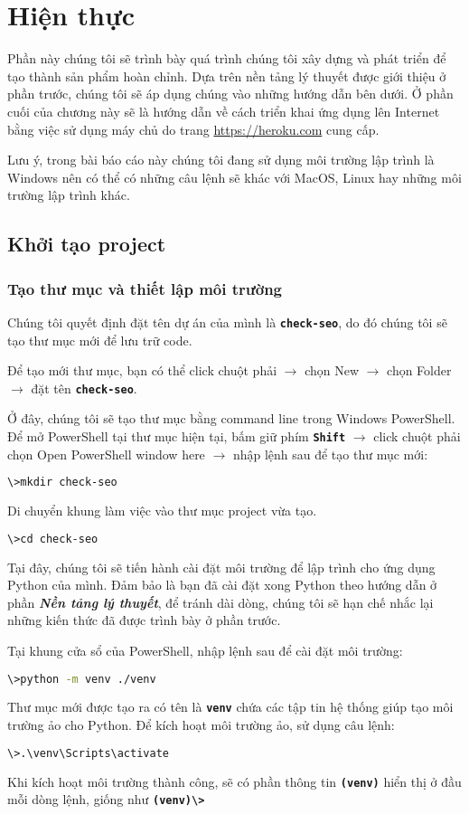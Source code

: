 \chapter{Hiện thực}
Phần này chúng tôi sẽ trình bày quá trình chúng tôi xây dựng và phát triển để tạo thành sản phẩm hoàn chỉnh. Dựa trên nền tảng lý thuyết được giới thiệu ở phần trước, chúng tôi sẽ áp dụng chúng vào những hướng dẫn bên dưới. Ở phần cuối của chương này sẽ là hướng dẫn về cách triển khai ứng dụng lên Internet bằng việc sử dụng máy chủ do trang \url{https://heroku.com} cung cấp.
\par
Lưu ý, trong bài báo cáo này chúng tôi đang sử dụng môi trường lập trình là Windows nên có thể có những câu lệnh sẽ khác với MacOS, Linux hay những môi trường lập trình khác.
\section{Khởi tạo project}
\subsection{Tạo thư mục và thiết lập môi trường}
Chúng tôi quyết định đặt tên dự án của mình là \textbf{\texttt{check-seo}}, do đó chúng tôi sẽ tạo thư mục mới để lưu trữ code.
\par
Để tạo mới thư mục, bạn có thể click chuột phải $\rightarrow$ chọn New $\rightarrow$ chọn Folder $\rightarrow$ đặt tên \textbf{\texttt{check-seo}}.
\par
Ở đây, chúng tôi sẽ tạo thư mục bằng command line trong Windows PowerShell. Để mở PowerShell tại thư mục hiện tại, bấm giữ phím \textbf{\texttt{Shift}} $\rightarrow$ click chuột phải chọn Open PowerShell window here $\rightarrow$ nhập lệnh sau để tạo thư mục mới:
\begin{lstlisting}[language=bash]
\>mkdir check-seo
\end{lstlisting}
\par
Di chuyển khung làm việc vào thư mục project vừa tạo.
\begin{lstlisting}[language=bash]
\>cd check-seo
\end{lstlisting}
\par
Tại đây, chúng tôi sẽ tiến hành cài đặt môi trường để lập trình cho ứng dụng Python của mình. Đảm bảo là bạn đã cài đặt xong Python theo hướng dẫn ở phần \textbf{\textit{Nền tảng lý thuyết}}, để tránh dài dòng, chúng tôi sẽ hạn chế nhắc lại những kiến thức đã được trình bày ở phần trước.
\par
Tại khung cửa sổ của PowerShell, nhập lệnh sau để cài đặt môi trường:
\begin{lstlisting}[language=bash]
\>python -m venv ./venv
\end{lstlisting}
\par
Thư mục mới được tạo ra có tên là \textbf{\texttt{venv}} chứa các tập tin hệ thống giúp tạo môi trường ảo cho Python. Để kích hoạt môi trường ảo, sử dụng câu lệnh:
\begin{lstlisting}[language=bash]
\>.\venv\Scripts\activate
\end{lstlisting}
\par
Khi kích hoạt môi trường thành công, sẽ có phần thông tin \textbf{\texttt{(venv)}} hiển thị ở đầu mỗi dòng lệnh, giống như \textbf{\texttt{(venv)\textbackslash>}}
